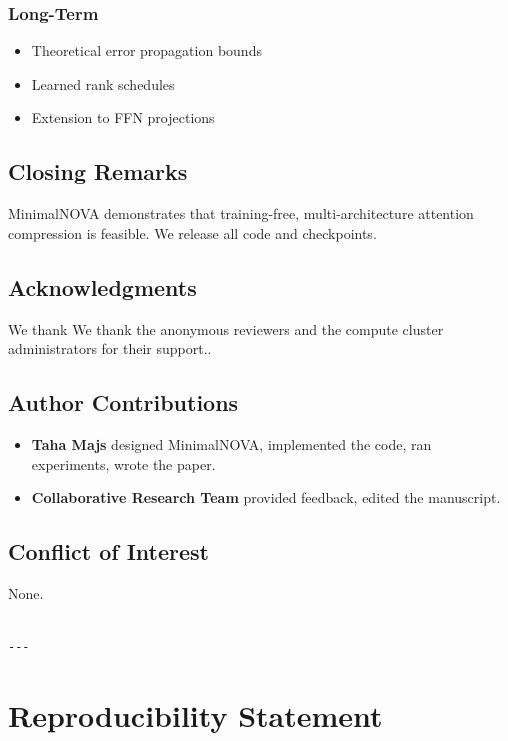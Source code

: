 \subsubsection{Long-Term}
\begin{itemize}
\item Theoretical error propagation bounds
\item Learned rank schedules
\item Extension to FFN projections

\end{itemize}
\subsection{Closing Remarks}

MinimalNOVA demonstrates that training-free, multi-architecture attention 
compression is feasible. We release all code and checkpoints.

\subsection{Acknowledgments}

We thank We thank the anonymous reviewers and the compute cluster administrators for their support..

\subsection{Author Contributions}

\begin{itemize}
\item \textbf{Taha Majs} designed MinimalNOVA, implemented the code, ran experiments,
  wrote the paper.
\item \textbf{Collaborative Research Team} provided feedback, edited the manuscript.

\end{itemize}
\subsection{Conflict of Interest}

None.
\begin{lstlisting}

---
\end{lstlisting}


\section{Reproducibility Statement}

